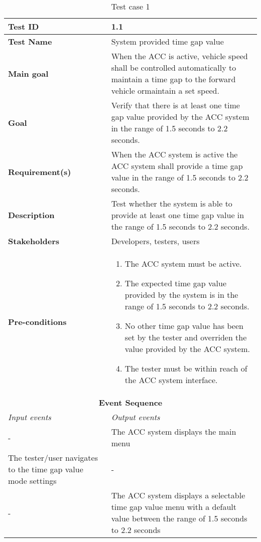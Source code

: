 \begin{table}[H]
\centering
\begin{tabularx}{\linewidth}{ X|X }
  \hline
  \textbf{Test ID} & 1.1 \\
  \hline
  \textbf{Test Name} & System provided time gap value \\
  \hline
  \textbf{Main goal} & When the ACC is active, vehicle speed shall be controlled automatically  to  maintain  a  time  gap  to  the  forward  vehicle  ormaintain a set speed. \\
  \hline
  \textbf{Goal} &  Verify that there is at least one time gap value provided by the ACC system in the range of 1.5 seconds to 2.2 seconds. \\
  \hline
  \textbf{Requirement(s)} &  When the ACC system is active the ACC system shall provide a time gap value in the range of 1.5 seconds to 2.2 seconds. \\
  \hline
  \textbf{Description} &  Test whether the system is able to provide at least one time gap value in the range of 1.5 seconds to 2.2 seconds. \\
  \hline
  \textbf{Stakeholders} &  Developers, testers, users\\
  \hline
  \textbf{Pre-conditions} &
  \begin{enumerate}
      \item The ACC system must be active.
      \item The expected time gap value provided by the system is in the range of 1.5 seconds to 2.2 seconds. 
      \item No other time gap value has been set by the tester and overriden the value provided by the ACC system.
      \item The tester must be within reach of the ACC system interface. 
  \end{enumerate} \\
  \hline
  \multicolumn{2}{c}{\textbf{Event Sequence}}\\
  \hline
  \textit{Input events} & \textit{Output events} \\
  \hline
   - & The ACC system displays the main menu \\
  \hline
  The tester/user navigates to the time gap value mode settings  & - \\
  \hline
   - &  The ACC system displays a selectable time gap value menu with a default value between the range of 1.5 seconds to 2.2 seconds \\
  \hline
  \end{tabularx}
\caption{\label{tab_case1} Test case 1}
\end{table}

